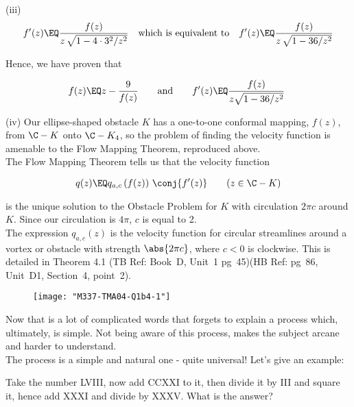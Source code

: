 \documentclass[english,a4paper,11pt]{scrartcl}
\begin{document}
\begin{labeling}{(iii) }
\[ f'(z) \EQ \frac{f(z)}{z \, \sqrt{1 - 4 \cdot 3^2 / z^2}} 
  \quad \text{which is equivalent to} \quad 
 f'(z) \EQ \frac{f(z)}{z \, \sqrt{1 - 36/z^2}} \]

\bigskip
Hence, we have proven that \\

\bigskip
\begin{Answer}
\[ \qquad f(z)  \EQ z - \frac{9}{f(z)} \qquad \text{and} \qquad 
   f'(z) \EQ \frac{f(z)}{z \sqrt{1 - 36/z^2}}  \qquad ~ \]
\end{Answer}   


\newpage
  \item [(iv)] Our ellipse-shaped obstacle $K$ has a one-to-one conformal mapping, $f(z)$, from $\C - K$ onto $\C - K_4$, so the problem of finding the velocity function is amenable to the Flow Mapping Theorem, reproduced above. \\

\bigskip  
The Flow Mapping Theorem tells us that the velocity function  

\[ q(z) \EQ q_{a,c}\left(f(z)\right) \, \conj{f'(z)} \qquad (z \in \C - K) \]

is the unique solution to the Obstacle Problem for $K$ with circulation $2\pi c$ around $K$. Since our circulation is $4\pi$, $c$ is equal to 2.\\

\bigskip
The expression $q_{a,c}(z)$ is the velocity function for circular streamlines around a vortex or obstacle with strength $\abs{2\pi c}$, where $c<0$ is clockwise. This is detailed in Theorem 4.1 (TB Ref: Book~D, Unit~1 pg~45)(HB Ref: pg~86, Unit~D1, Section~4, point~2). \\

\bigskip

\begin{figure}[H]
	\centering
	\texttt{[image: "M337-TMA04-Q1b4-1"]}
\end{figure}

\newpage

Now that is a lot of complicated words that forgets to explain a process which, ultimately, is simple. Not being aware of this process, makes the subject arcane and harder to understand. \\

\bigskip
The process is a simple and natural one - quite universal! Let's give an example:\\

\bigskip
\begin{TextBox}[width=0.90]{}
Take the number LVIII, now add CCXXI to it, then divide it by III and square it, hence add XXXI and divide by XXXV. What is the answer? 
\end{TextBox}


\end{labeling}
\end{document}
